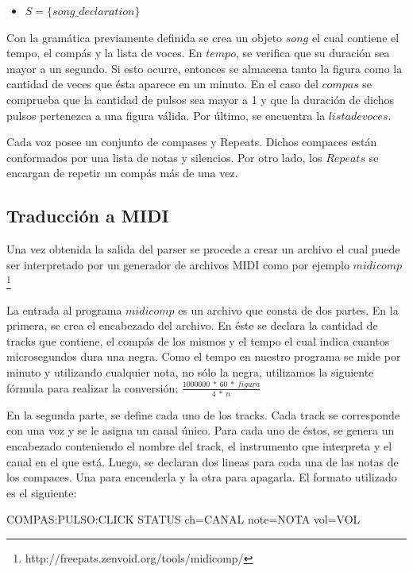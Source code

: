 \documentclass[a4paper, 10pt, twoside]{article}
\begin{document}
\begin{itemize}
\begin{equation*}
\begin{array}{l}
  \end{array}
  \right.
\end{equation*}
\item $S = \{song\_declaration\}$

\end{itemize}

Con la gramática previamente definida se crea un objeto $song$ el cual contiene el tempo, el compás y la lista de voces. En $tempo$, se verifica que su duración sea mayor a un segundo. Si esto ocurre, entonces se almacena tanto la figura como la cantidad de veces que ésta aparece en un minuto. En el caso del $compas$ se comprueba que la cantidad de pulsos sea mayor a 1 y que la duración de dichos pulsos pertenezca a una figura válida. Por último, se encuentra la $lista de voces$. 

Cada voz posee un conjunto de compases y Repeats. Dichos compaces están conformados por una lista de notas y silencios. Por otro lado, los $Repeats$ se encargan de repetir un compás más de una vez.

\subsection{Traducción a MIDI}
Una vez obtenida la salida del parser se procede a crear un archivo el cual puede ser interpretado por un generador de archivos MIDI como por ejemplo $midicomp$ \footnote{http://freepats.zenvoid.org/tools/midicomp/}

La entrada al programa $midicomp$ es un archivo que consta de dos partes. En la primera, se crea el encabezado del archivo. En éste se declara la cantidad de tracks que contiene, el compás de los mismos y el tempo el cual indica cuantos microsegundos dura una negra. Como el tempo en nuestro programa se mide por minuto y utilizando cualquier nota, no sólo la negra, utilizamos la siguiente fórmula para realizar la conversión:
$\frac{1000000\ *\ 60\ *\ figura}{4\ *\ n}$

En la segunda parte, se define cada uno de los tracks. Cada track se corresponde con una voz y se le asigna un canal único. Para cada uno de éstos, se genera un encabezado conteniendo el nombre del track, el instrumento que interpreta y el canal en el que está. Luego, se declaran dos lineas para coda una de las notas de los compaces. Una para encenderla y la otra para apagarla. El formato utilizado es el siguiente:

\begin{center} 
COMPAS:PULSO:CLICK STATUS ch=CANAL note=NOTA vol=VOL
\end{center}
\end{document}
